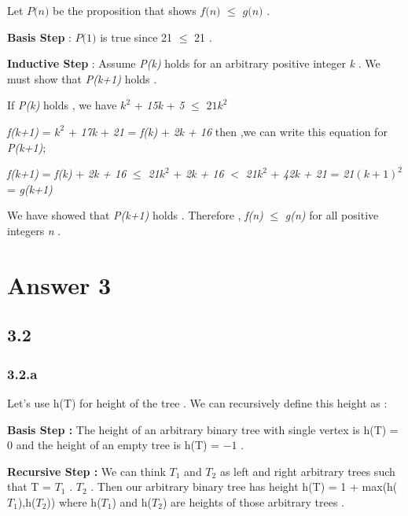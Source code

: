 \documentclass[12pt]{article}
\begin{document}
\hspace{15px} Let $\textit{P(n)}$ be the proposition that shows $\textit{f(n)}$ $\leq$ $\textit{g(n)}$ . \\ \par 
\textbf{Basis Step} : $\textit{P(1)}$ is true since 21 $\leq$ 21 . \par 
\textbf{Inductive Step} : Assume \textit{P(k)} holds for an arbitrary positive integer \textit{k} . We must show that \textit{P(k+1)} holds . \par 
If \textit{P(k)} holds , we have \textit{$k^{2}$} + \textit{15k} + \textit{5} $\leq$ \textit{$21k^{2}$} \par 
\textit{f(k+1)} = \textit{$k^{2}$} + \textit{17k} + \textit{21} = \textit{f(k)} + \textit{2k + 16} then ,we can write this equation for \textit{P(k+1)}; \par 
\textit{f(k+1)} = \textit{f(k)} + \textit{2k + 16} $\leq$ \textit{21$k^{2}$} + \textit{2k + 16} $<$ \textit{21$k^{2}$} + \textit{42k + 21} = \textit{21$(k+1)^{2}$} = \textit{g(k+1)}\\ \par 
We have showed that \textit{P(k+1)} holds . Therefore , \textit{f(n)} $\leq$ \textit{g(n)} for all positive integers \textit{n} .
\section*{Answer 3}
\subsection*{3.2} 
\subsubsection*{3.2.a} 
\hspace{15px} Let's use h(T) for height of the tree . We can recursively define this height as :\par 
\textbf{Basis Step :} The height of an arbitrary binary tree with single vertex is h(T) = \textit{$0$} and the height of an empty tree is h(T) = \textit{$-1$} . \par 
\textbf{Recursive Step :} We can think \textit{$T_1$} and \textit{$T_2$} as left and right arbitrary trees such that T = \textit{$T_1$} . \textit{$T_2$} . Then our arbitrary binary tree has height h(T) = 1 + max(h(\textit{$T_1$}),h(\textit{$T_2$})) where h(\textit{$T_1$}) and h(\textit{$T_2$}) are heights of those arbitrary trees .
\end{document}
